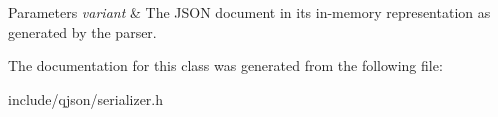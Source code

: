 \begin{DoxyParams}{\-Parameters}
{\em variant} & \-The \-J\-S\-O\-N document in its in-\/memory representation as generated by the parser. \\
\hline
\end{DoxyParams}


\-The documentation for this class was generated from the following file\-:\begin{DoxyCompactItemize}
\item 
include/qjson/serializer.\-h\end{DoxyCompactItemize}
